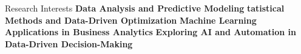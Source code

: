 \begin{rubric}{Research Interests}
\entry* \textbf{Data Analysis and Predictive Modeling}
\entry* \textbf{tatistical Methods and Data-Driven Optimization}
\entry* \textbf{Machine Learning Applications in Business Analytics}
\entry* \textbf{Exploring AI and Automation in Data-Driven Decision-Making}
\end{rubric}
